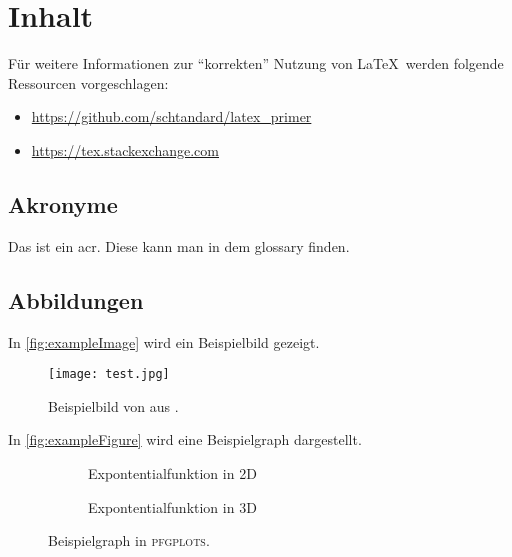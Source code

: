 \section{Inhalt}


Für weitere Informationen zur \enquote{korrekten} Nutzung von \LaTeX\ werden folgende Ressourcen vorgeschlagen:

\begin{itemize}
    \item \url{https://github.com/schtandard/latex_primer}
    \item \url{https://tex.stackexchange.com}
\end{itemize}


\subsection{Akronyme}

Das ist ein \gls{acr}.
Diese kann man in dem \gls{glossary} finden.

\subsection{Abbildungen}

In \autoref{fig:exampleImage} wird ein Beispielbild gezeigt.

\begin{figure}[ht]
    \centering
    \texttt{[image: test.jpg]}
    \caption[Beispielbild]{Beispielbild von \citeauthor{exampleImage} aus \autocite{exampleImage}.}
    \label{fig:exampleImage}
\end{figure}

In \autoref{fig:exampleFigure} wird eine Beispielgraph dargestellt.

\begin{figure}[ht]
    \centering
    \begin{subfigure}{0.45\textwidth}
        \caption{Expontentialfunktion in 2D}
        \label{fig:2d-exp}
    \end{subfigure}
    \begin{subfigure}{0.45\textwidth}
        \caption{Expontentialfunktion in 3D}
        \label{fig:3d-exp}
    \end{subfigure}
    \caption[Beispielgraph]{Beispielgraph in \textsc{pfgplots}.}
    \label{fig:exampleFigure}
\end{figure}


